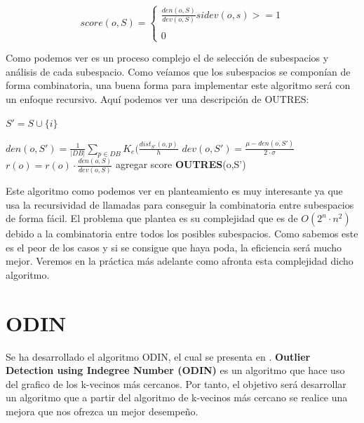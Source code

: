 \[ score(o,S) = \left\{ \begin{array}{lcc}
    \frac{den(o,S)}{dev(o,S)} si  dev(o,s) >=1 \\
    \\ 0 
    \end{array}
\right.\]

Como podemos ver es un proceso complejo el de selección de subespacios y análisis de 
cada subespacio. Como veíamos que los subespacios se componían de forma combinatoria,
una buena forma para implementar este algoritmo será con un enfoque recursivo. Aquí podemos
ver una descripción de OUTRES:



\begin{codigo}
    \begin{algorithmic}[1]
    \State \parbox[t]{305pt}{$ S' = S \cup \lbrace i \rbrace $}
    
    \State $den(o,S') = \frac{1}{|DB|} \sum_{p \in DB} K_e ( \frac{dist_{S'}(o,p)}{h}$
    \State $dev(o,S') = \frac{\mu - den(o,S')}{2 \cdot \sigma}$
    \State $r(o) = r(o) \cdot \frac{den(o,S)}{dev(o,S)} $  agregar score
    \EndIf
    \State \textbf{OUTRES}(o,S')
    \EndIf  
    \EndFor
    \EndFunction 
    \end{algorithmic}
\end{codigo}

Este algoritmo como podemos ver en planteamiento es muy interesante ya que usa la 
recursividad de llamadas para conseguir la combinatoria entre subespacios de forma
fácil. El problema que 
plantea es su complejidad que es de $O(2^n \cdot n^2)$ debido a la combinatoria entre
todos los posibles subespacios. Como sabemos este es el peor de los casos y si se consigue
que haya poda, la eficiencia será mucho mejor. Veremos en la práctica más adelante como
afronta esta complejidad dicho algoritmo.


\section{ODIN}
Se ha desarrollado el algoritmo ODIN, el cual se presenta en \cite{hautamakiOutlierDetectionUsing2004}. 
\textbf{Outlier Detection using Indegree Number (ODIN)} es un algoritmo que hace uso 
del grafico de los k-vecinos más cercanos. Por tanto, el objetivo será desarrollar un 
algoritmo que a partir del algoritmo de k-vecinos más cercano se realice una mejora que 
nos ofrezca un mejor desempeño.

